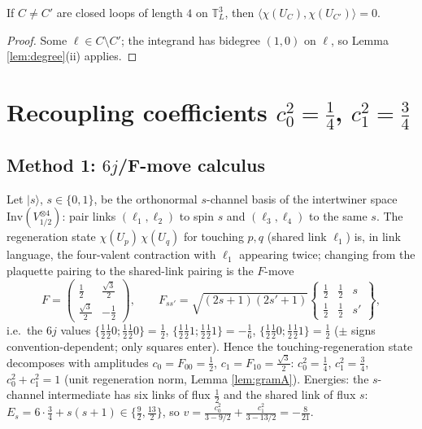 \begin{lemma}\label{lem:offsupport}
If $C\ne C'$ are closed loops of length $4$ on $\mathbb T_L^3$, then
$\langle\chi(U_C),\chi(U_{C'})\rangle=0$.
\end{lemma}
\begin{proof}
Some $\ell\in C\setminus C'$; the integrand has bidegree $(1,0)$ on $\ell$,
so Lemma \ref{lem:degree}(ii) applies.
\end{proof}

\section{Recoupling coefficients $c_0^2=\tfrac14$, $c_1^2=\tfrac34$}\label{app:B}
\subsection{Method 1: $6j$/F-move calculus}
Let $|s\rangle$, $s\in\{0,1\}$, be the orthonormal $s$-channel basis of the
intertwiner space $\mathrm{Inv}(V_{1/2}^{\otimes 4})$: pair links
$(\ell_1,\ell_2)$ to spin $s$ and $(\ell_3,\ell_4)$ to the same $s$. The
regeneration state $\chi(U_{p})\,\chi(U_{q})$ for touching $p,q$ (shared
link $\ell_1$) is, in link language, the four-valent contraction with
$\ell_1$ appearing twice; changing from the plaquette pairing to the
shared-link pairing is the $F$-move
\[
F=\begin{pmatrix}\tfrac12 & \tfrac{\sqrt3}{2}\\[2pt]
\tfrac{\sqrt3}{2} & -\tfrac12\end{pmatrix},
\qquad
F_{ss'}=\sqrt{(2s+1)(2s'+1)}
\left\{\begin{matrix}\tfrac12&\tfrac12&s\\ \tfrac12&\tfrac12&s'\end{matrix}\right\},
\]
i.e.\ the $6j$ values
$\{ \tfrac12\tfrac12 0;\tfrac12\tfrac12 0\}=\tfrac12$,
$\{\tfrac12\tfrac12 1;\tfrac12\tfrac12 1\}=-\tfrac16$,
$\{\tfrac12\tfrac12 0;\tfrac12\tfrac12 1\}=\tfrac12$
($\pm$ signs convention-dependent; only squares enter). Hence the
touching-regeneration state decomposes with amplitudes
$c_0=F_{00}=\tfrac12$, $c_1=F_{10}=\tfrac{\sqrt3}{2}$:
$c_0^2=\tfrac14$, $c_1^2=\tfrac34$, $c_0^2+c_1^2=1$ (unit regeneration norm,
Lemma \ref{lem:gramA}). Energies: the $s$-channel intermediate has six links
of flux $\tfrac12$ and the shared link of flux $s$:
$E_s=6\cdot\tfrac34+s(s+1)\in\{\tfrac92,\tfrac{13}{2}\}$, so
$v=\frac{c_0^2}{3-9/2}+\frac{c_1^2}{3-13/2}=-\frac8{21}$.

